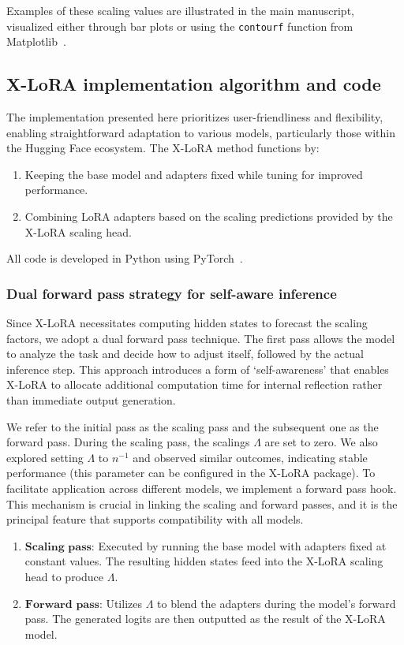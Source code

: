 Examples of these scaling values are illustrated in the main manuscript, visualized either through bar plots or using the \texttt{contourf} function from Matplotlib~\cite{MatplotlibDocumentation}.

\subsection{X-LoRA implementation algorithm and code} The implementation presented here prioritizes user-friendliness and flexibility, enabling straightforward adaptation to various models, particularly those within the Hugging Face ecosystem. The X-LoRA method functions by:

\begin{enumerate}
    \item Keeping the base model and adapters fixed while tuning for improved performance.
    \item Combining LoRA adapters based on the scaling predictions provided by the X-LoRA scaling head.
\end{enumerate}

All code is developed in Python using PyTorch~\cite{Paszke2019PyTorchLibrary}. 

\subsubsection{Dual forward pass strategy for self-aware inference} Since X-LoRA necessitates computing hidden states to forecast the scaling factors, we adopt a dual forward pass technique. The first pass allows the model to analyze the task and decide how to adjust itself, followed by the actual inference step. This approach introduces a form of `self-awareness' that enables X-LoRA to allocate additional computation time for internal reflection rather than immediate output generation.

We refer to the initial pass as the scaling pass and the subsequent one as the forward pass. During the scaling pass, the scalings $\Lambda$ are set to zero. We also explored setting $\Lambda$ to ${n}^{-1}$ and observed similar outcomes, indicating stable performance (this parameter can be configured in the X-LoRA package). To facilitate application across different models, we implement a forward pass hook. This mechanism is crucial in linking the scaling and forward passes, and it is the principal feature that supports compatibility with all models.

\begin{enumerate}
    \item $\mathbf{Scaling}$ $\mathbf{pass}$: Executed by running the base model with adapters fixed at constant values. The resulting hidden states feed into the X-LoRA scaling head to produce $\Lambda$.
    \item $\mathbf{Forward}$ $\mathbf{pass}$: Utilizes $\Lambda$ to blend the adapters during the model's forward pass. The generated logits are then outputted as the result of the X-LoRA model.
\end{enumerate}

